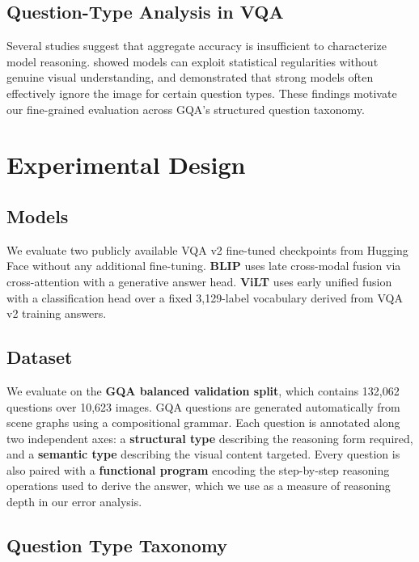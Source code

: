 \documentclass[11pt]{article}
\begin{document}
\subsection{Question-Type Analysis in VQA}
Several studies suggest that aggregate accuracy is insufficient to characterize model reasoning. \citet{johnson2017clevr} showed models can exploit statistical regularities without genuine visual understanding, and \citet{agrawal2018don} demonstrated that strong models often effectively ignore the image for certain question types. These findings motivate our fine-grained evaluation across GQA's structured question taxonomy.

\section{Experimental Design}

\subsection{Models}
We evaluate two publicly available VQA v2 fine-tuned checkpoints from Hugging Face without any additional fine-tuning. \textbf{BLIP} \cite{li2022blip} uses late cross-modal fusion via cross-attention with a generative answer head. \textbf{ViLT} \cite{kim2021vilt} uses early unified fusion with a classification head over a fixed 3,129-label vocabulary derived from VQA v2 training answers.

\subsection{Dataset}

We evaluate on the \textbf{GQA balanced validation split}, which contains 132,062 questions over 10,623 images. GQA questions are generated automatically from scene graphs using a compositional grammar. Each question is annotated along two independent axes: a \textbf{structural type} describing the reasoning form required, and a \textbf{semantic type} describing the visual content targeted. Every question is also paired with a \textbf{functional program} encoding the step-by-step reasoning operations used to derive the answer, which we use as a measure of reasoning depth in our error analysis.

\subsection{Question Type Taxonomy}
\end{document}
